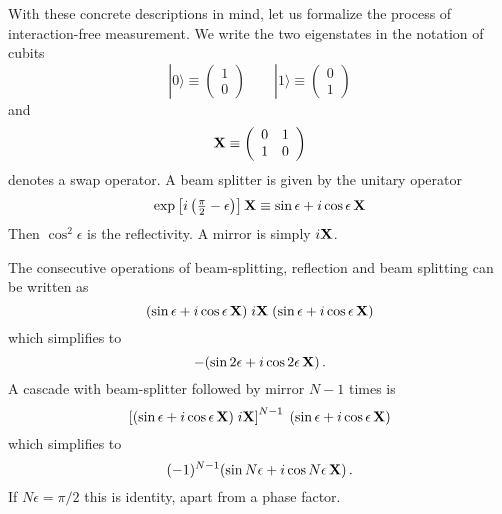 \documentclass[12pt,aps,prb,preprint]{revtex4}
\def\ket#1{|#1\rangle}
\def\X{{\bf X}}
\begin{document}
With these concrete descriptions in mind, let us formalize the process
of interaction-free measurement.  We write the two eigenstates in the
notation of cubits
\begin{equation}
\ket0 \equiv \left( \begin{array}{c} 1 \\ 0 \end{array} \right)  \qquad
\ket1 \equiv \left( \begin{array}{c} 0 \\ 1 \end{array} \right)
\end{equation}
and
\begin{equation}
\X \equiv \left( \begin{array}{cc} 0 & 1 \\ 1 & 0 \end{array} \right)
\end{equation}
denotes a swap operator.  A beam splitter is given by the unitary operator
\begin{equation}
\exp\left[i\left({\textstyle\frac\pi2-\epsilon}\right)\right] \X \equiv
\sin\epsilon + i\cos\epsilon\,\X
\end{equation}
Then $\cos^2\epsilon$ is the reflectivity.  A mirror is simply $i\X$.

The consecutive operations of beam-splitting, reflection and beam
splitting can be written as
\begin{equation}
     (\sin\epsilon + i\cos\epsilon\,\X)
     \; i\X \;
     (\sin\epsilon + i\cos\epsilon\,\X)
\end{equation}
which simplifies to
\begin{equation}
     -(\sin2\epsilon + i\cos2\epsilon\,\X) \,.
\end{equation}
A cascade with beam-splitter followed by mirror $N-1$ times is
\begin{equation}
     \left[ (\sin\epsilon + i\cos\epsilon\,\X) \; i\X \right]^{N-1} \;
     (\sin\epsilon + i\cos\epsilon\,\X)
\end{equation}
which simplifies to
\begin{equation}
     (-1)^{N-1} (\sin N\epsilon + i\cos N\epsilon\,\X)  \,.
\end{equation}
If $N\epsilon=\pi/2$ this is identity, apart from a phase factor.
\end{document}
